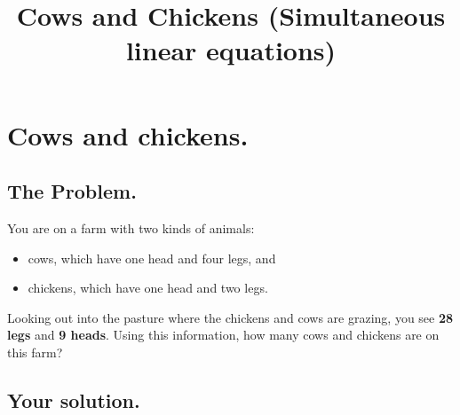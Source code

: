 \documentclass[12pt]{article}
\title{Cows and Chickens (Simultaneous linear equations)}
\begin{document}
\section*{Cows and chickens.}

\subsection*{The Problem.}

You are on a farm with two kinds of animals:
\begin{itemize}
\item cows, which have one head and four legs, and
\item chickens, which have one head and two legs.
\end{itemize}
Looking out into the pasture where the chickens and cows are grazing,
you see \textbf{28 legs} and \textbf{9 heads}.  Using this
information, how many cows and chickens are on this farm?

\subsection*{Your solution.}
\end{document}
